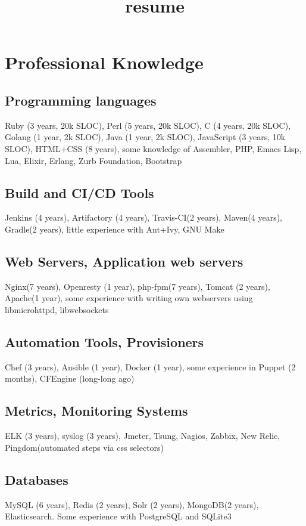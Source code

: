 \documentclass[letterpaper]{article}
\date{}
\title{resume}
\renewcommand\maketitle{}
\begin{document}
\maketitle
{}

\section{Professional Knowledge}
\label{sec-1}
\subsection{Programming languages}
\label{sec-1-1}
Ruby (3 years, 20k SLOC), Perl (5 years, 20k SLOC), C (4 years, 20k SLOC), Golang (1 year, 2k SLOC), Java (1 year, 2k SLOC), JavaScript (3 years, 10k SLOC), HTML+CSS (8 years), some knowledge of Assembler, PHP, Emacs Lisp, Lua, Elixir, Erlang, Zurb Foundation, Bootstrap
\subsection{Build and CI/CD Tools}
\label{sec-1-2}
Jenkins (4 years), Artifactory (4 years), Travis-CI(2 years), Maven(4 years), Gradle(2 years), little experience with Ant+Ivy, GNU Make
\subsection{Web Servers, Application web servers}
\label{sec-1-3}
Nginx(7 years), Openresty (1 year), php-fpm(7 years), Tomcat (2 years), Apache(1 year), some experience with writing own webservers using libmicrohttpd, libwebsockets
\subsection{Automation Tools, Provisioners}
\label{sec-1-4}
Chef (3 years), Ansible (1 year), Docker (1 year), some experience in Puppet (2 months), CFEngine (long-long ago)
\subsection{Metrics, Monitoring Systems}
\label{sec-1-5}
ELK (3 years), syslog (3 years), Jmeter, Tsung, Nagios, Zabbix, New Relic, Pingdom(automated steps via css selectors)
\subsection{Databases}
\label{sec-1-6}
MySQL (6 years), Redis (2 years), Solr (2 years), MongoDB(2 years), Elasticsearch. Some experience with PostgreSQL and SQLite3
\end{document}
